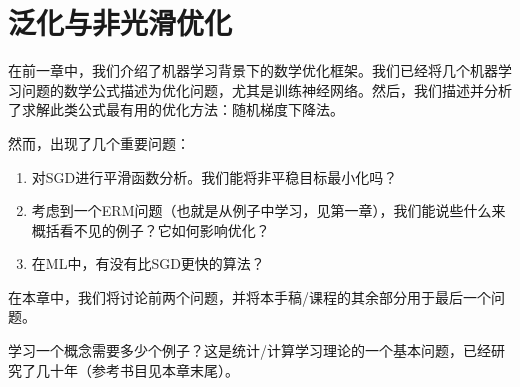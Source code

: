 \chapter{
    泛化与非光滑优化
    } \label{chap:first order}

在前一章中，我们介绍了机器学习背景下的数学优化框架。我们已经将几个机器学习问题的数学公式描述为优化问题，尤其是训练神经网络。然后，我们描述并分析了求解此类公式最有用的优化方法：随机梯度下降法。

然而，出现了几个重要问题：
\begin{enumerate}
\item
对SGD进行平滑函数分析。我们能将非平稳目标最小化吗？

\item
考虑到一个ERM问题（也就是从例子中学习，见第一章），我们能说些什么来概括看不见的例子？它如何影响优化？

\item 
在ML中，有没有比SGD更快的算法？

\end{enumerate}

在本章中，我们将讨论前两个问题，并将本手稿/课程的其余部分用于最后一个问题。

学习一个概念需要多少个例子？这是统计/计算学习理论的一个基本问题，已经研究了几十年（参考书目见本章末尾）。

